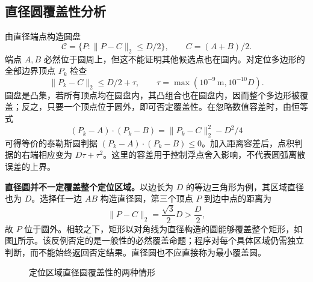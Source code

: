 \subsection{直径圆覆盖性分析}
由直径端点构造圆盘
\begin{equation}
 \mathcal C=\{P:\|P-C\|_2\leq D/2\},\qquad C=(A+B)/2.
\end{equation}
端点 $A,B$ 必然位于圆周上，但这不能证明其他候选点也在圆内。对定位多边形的全部边界顶点 $P_k$ 检查
\begin{equation}
 \|P_k-C\|_2\leq D/2+\tau,\qquad
 \tau=\max(10^{-9}\,\mathrm m,10^{-10}D).
 \label{eq:cover}
\end{equation}
圆盘是凸集，若所有顶点均在圆盘内，其凸组合也在圆盘内，因而整个多边形被覆盖；反之，只要一个顶点位于圆外，即可否定覆盖性。在忽略数值容差时，由恒等式
\begin{equation}
 (P_k-A)\cdot(P_k-B)=\|P_k-C\|_2^2-D^2/4
\end{equation}
可得等价的泰勒斯圆判据 $(P_k-A)\cdot(P_k-B)\leq0$。加入距离容差后，点积判据的右端相应变为 $D\tau+\tau^2$。这里的容差用于控制浮点舍入影响，不代表圆弧离散误差的上界。

\textbf{直径圆并不一定覆盖整个定位区域。}以边长为 $D$ 的等边三角形为例，其区域直径也为 $D$。选择任一边 $AB$ 构造直径圆，第三个顶点 $P$ 到边中点的距离为
\begin{equation}
 \|P-C\|_2=\frac{\sqrt3}{2}D>\frac D2,
\end{equation}
故 $P$ 位于圆外。相较之下，矩形以对角线为直径构造的圆能够覆盖整个矩形，如图\ref{fig:cover}所示。该反例否定的是一般性的必然覆盖命题；程序对每个具体区域仍需独立判断，而不能始终返回否定结果。直径圆也不应直接称为最小覆盖圆。
\begin{figure}[htbp]\centering
\caption{定位区域直径圆覆盖性的两种情形}\label{fig:cover}\end{figure}

